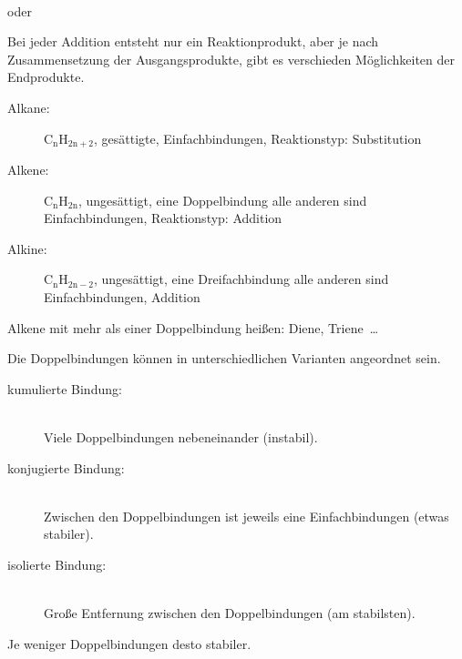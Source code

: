 \begin{minipage}{0.45\hsize}
	\chemsign{+}%
\end{minipage}\hfill
\begin{minipage}{0.45\hsize}
	\ce{->}  \\
	oder \\
	\ce{->} 
\end{minipage}

Bei jeder Addition entsteht nur ein Reaktionprodukt,
aber je nach Zusammensetzung der Ausgangsprodukte, gibt es verschieden Möglichkeiten
der Endprodukte.

\begin{description}
	\item[Alkane:] $\mathrm{C_nH_{2n+2}}$, gesättigte, Einfachbindungen,
		Reaktionstyp: Substitution
	\item[Alkene:] $\mathrm{C_nH_{2n}}$, ungesättigt, eine Doppelbindung
		alle anderen sind Einfachbindungen, Reaktionstyp: Addition
	\item[Alkine:] $\mathrm{C_nH_{2n-2}}$, ungesättigt, eine Dreifachbindung
		alle anderen sind Einfachbindungen, Addition
\end{description}

Alkene mit mehr als einer Doppelbindung heißen: Diene, Triene~\dots

Die Doppelbindungen können in unterschiedlichen Varianten angeordnet sein.

\begin{description}
	\item[kumulierte Bindung:]
		 \\[0.5ex]
		Viele Doppelbindungen nebeneinander (instabil).
	\item[konjugierte Bindung:]
		 \\[0.5ex]
		Zwischen den Doppelbindungen ist jeweils eine Einfachbindungen
		(etwas stabiler).
	\item[isolierte Bindung:]
		 \\[0.5ex]
		Große Entfernung zwischen den Doppelbindungen (am stabilsten).
\end{description}

Je weniger Doppelbindungen desto stabiler.
